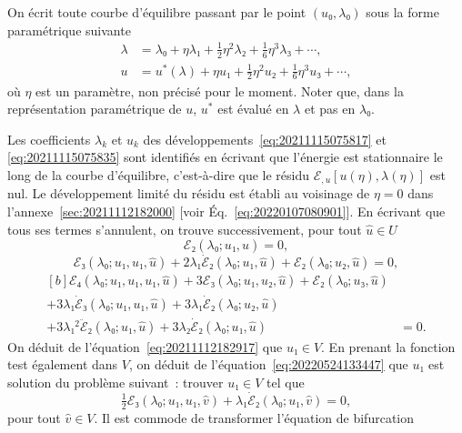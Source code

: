 \documentclass[12pt, final]{amsart}
\theoremstyle{definition}
\begin{document}
On écrit toute courbe d'équilibre passant par le point \((u₀, λ₀)\) sous la
forme paramétrique suivante
\begin{align}
  \label{eq:20211115075817}
  λ &=  λ₀ + η λ₁ + \tfrac{1}{2} η^2 λ₂ + \tfrac{1}{6} η^3 λ₃ + \cdots,\\
  \label{eq:20211115075835}
  u &= u^{\ast}(λ) + η u₁ + \tfrac{1}{2} η^2 u₂ + \tfrac{1}{6} η^3 u₃ + \cdots,
\end{align}
où \(η\) est un paramètre, non précisé pour le moment. Noter que, dans la
représentation paramétrique de \(u\), \(u^{\ast}\) est évalué en \(λ\) et pas en
\(λ₀\).

Les coefficients \(λ_k\) et \(u_k\) des développements~\eqref{eq:20211115075817}
et \eqref{eq:20211115075835} sont identifiés en écrivant que l'énergie est
stationnaire le long de la courbe d'équilibre, c'est-à-dire que le résidu
\(ℰ_{, u} [u(η), λ(η)]\) est nul. Le développement limité du résidu est établi
au voisinage de \(η = 0\) dans l'annexe~\ref{sec:20211112182000} [voir
Éq.~\eqref{eq:20220107080901}]. En écrivant que tous ses termes s'annulent, on
trouve successivement, pour tout \(\hat{u}∈U\)
\begin{equation}
  \label{eq:20211112182917}
  ℰ₂(λ₀; u₁, \hat{u}) = 0,
\end{equation}
\begin{equation}
  \label{eq:20220524133447}
  ℰ₃(λ₀; u₁, u₁, \hat{u}) + 2λ₁\dot{ℰ}₂(λ₀; u₁, \hat{u}) + ℰ₂(λ₀; u₂, \hat{u}) = 0,
\end{equation}
\begin{equation}
  \label{eq:res3}
  \begin{aligned}[b]
    ℰ₄(λ₀; u₁, u₁, u₁, \hat{u}) + 3ℰ₃(λ₀; u₁, u₂, \hat{u}) + ℰ₂(λ₀; u₃, \hat{u})&\\
    + 3λ₁\dot{ℰ}₃(λ₀; u₁, u₁, \hat{u}) + 3λ₁\dot{ℰ}₂(λ₀;  u₂, \hat{u})&\\
    + 3λ₁^2\ddot{ℰ}₂(λ₀; u₁, \hat{u}) + 3λ₂\dot{ℰ}₂(λ₀; u₁, \hat{u}) & = 0.
  \end{aligned}
\end{equation}
On déduit de l'équation~\eqref{eq:20211112182917} que \(u₁∈V\). En prenant la
fonction test également dans \(V\), on déduit de
l'équation~\eqref{eq:20220524133447} que \(u₁\) est solution du problème
suivant~: trouver \(u₁∈V\) tel que
\begin{equation}
  \label{eq:20220524133816}
  \tfrac{1}{2} ℰ₃(λ₀; u₁, u₁, \hat{v}) + λ₁\dot{ℰ}₂(λ₀; u₁, \hat{v}) = 0,
\end{equation}
pour tout \(\hat{v}∈V\). Il est commode de transformer l'équation de bifurcation
\end{document}
